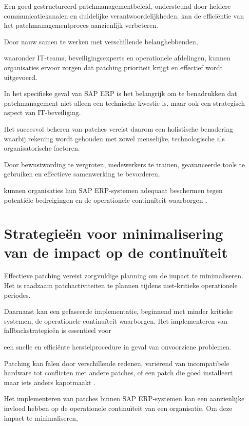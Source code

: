 Een goed gestructureerd patchmanagementbeleid, ondersteund door heldere communicatiekanalen en duidelijke verantwoordelijkheden, kan de efficiëntie van het patchmanagementproces aanzienlijk verbeteren.

Door nauw samen te werken met verschillende belanghebbenden, 

waaronder IT-teams, beveiligingsexperts en operationele afdelingen, kunnen organisaties ervoor zorgen dat patching prioriteit krijgt en effectief wordt uitgevoerd.


In het specifieke geval van SAP ERP is het belangrijk om te benadrukken dat patchmanagement niet alleen een technische kwestie is, maar ook een strategisch aspect van IT-beveiliging.

Het succesvol beheren van patches vereist daarom een holistische benadering waarbij rekening wordt gehouden met zowel menselijke, technologische als organisatorische factoren.

Door bewustwording te vergroten, medewerkers te trainen, geavanceerde tools te gebruiken en effectieve samenwerking te bevorderen, 

kunnen organisaties hun SAP ERP-systemen adequaat beschermen tegen potentiële bedreigingen en de operationele continuïteit waarborgen \autocite{Graffeo2018}.

\section{Strategieën voor minimalisering van de impact op de continuïteit}
Effectieve patching vereist zorgvuldige planning om de impact te minimaliseren. Het is raadzaam patchactiviteiten te plannen tijdens niet-kritieke operationele periodes.

Daarnaast kan een gefaseerde implementatie, beginnend met minder kritieke systemen, de operationele continuïteit waarborgen. Het implementeren van fallbackstrategieën is essentieel voor 

een snelle en efficiënte herstelprocedure in geval van onvoorziene problemen. 

Patching kan falen door verschillende redenen, variërend van incompatibele hardware tot conflicten met andere patches, of een patch die goed installeert maar iets anders kapotmaakt \autocite{Shein2022}.

Het implementeren van patches binnen SAP ERP-systemen kan een aanzienlijke invloed hebben op de operationele continuïteit van een organisatie. Om deze impact te minimaliseren,

